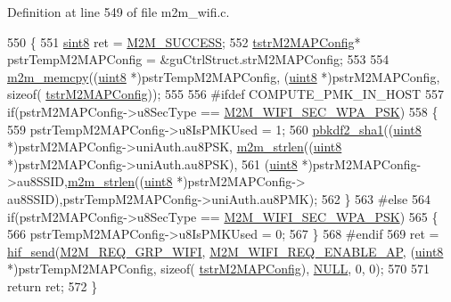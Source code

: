 Definition at line 549 of file m2m\+\_\+wifi.\+c.


\begin{DoxyCode}
550 \{
551     \hyperlink{group__DataT_gae35f10ffd0ac8dd2bc3e794da9bdfbc7}{sint8} ret = \hyperlink{nm__common_8h_a9ef27ba27aafdd1aa3a79d3ba2c36b8f}{M2M\_SUCCESS};
552     \hyperlink{structtstrM2MAPConfig}{tstrM2MAPConfig}* pstrTempM2MAPConfig = &guCtrlStruct.strM2MAPConfig;
553     
554     \hyperlink{nm__common_8h_a62b30b611dfcc58e190254d1f663470a}{m2m\_memcpy}((\hyperlink{group__DataT_ga4df709a77647e870bbf1d955b8edc9a6}{uint8} *)pstrTempM2MAPConfig, (\hyperlink{group__DataT_ga4df709a77647e870bbf1d955b8edc9a6}{uint8} *)pstrM2MAPConfig, \textcolor{keyword}{sizeof}(
      \hyperlink{structtstrM2MAPConfig}{tstrM2MAPConfig}));
555     
556 \textcolor{preprocessor}{#ifdef COMPUTE\_PMK\_IN\_HOST}
557     \textcolor{keywordflow}{if}(pstrM2MAPConfig->u8SecType == \hyperlink{group__WlanEnums_ggaa232a09c953ec8200c13774f94107b05a951d0504fc8e173e60df8ee871f16697}{M2M\_WIFI\_SEC\_WPA\_PSK})
558     \{       
559         pstrTempM2MAPConfig->u8IsPMKUsed = 1;
560         \hyperlink{third__party_2atmel_2devices_2wilc1000_2drv__hash_2crypto_8h_a318c7e175b5bc9991153031d59b52ac0}{pbkdf2\_sha1}((\hyperlink{group__DataT_ga4df709a77647e870bbf1d955b8edc9a6}{uint8} *)pstrM2MAPConfig->uniAuth.au8PSK,
      \hyperlink{nm__common_8h_a3c10c83b6b5eda6b18bbc40ca411eeb4}{m2m\_strlen}((\hyperlink{group__DataT_ga4df709a77647e870bbf1d955b8edc9a6}{uint8} *)pstrM2MAPConfig->uniAuth.au8PSK),
561             (\hyperlink{group__DataT_ga4df709a77647e870bbf1d955b8edc9a6}{uint8} *)pstrM2MAPConfig->au8SSID,\hyperlink{nm__common_8h_a3c10c83b6b5eda6b18bbc40ca411eeb4}{m2m\_strlen}((\hyperlink{group__DataT_ga4df709a77647e870bbf1d955b8edc9a6}{uint8} *)pstrM2MAPConfig->
      au8SSID),pstrTempM2MAPConfig->uniAuth.au8PMK);
562     \}
563 \textcolor{preprocessor}{#else}
564     \textcolor{keywordflow}{if}(pstrM2MAPConfig->u8SecType == \hyperlink{group__WlanEnums_ggaa232a09c953ec8200c13774f94107b05a951d0504fc8e173e60df8ee871f16697}{M2M\_WIFI\_SEC\_WPA\_PSK})
565     \{
566         pstrTempM2MAPConfig->u8IsPMKUsed = 0;
567     \}
568 \textcolor{preprocessor}{#endif}
569     ret = \hyperlink{m2m__hif_8c_a13ba8ad11b2ac39516ca787386d16ce0}{hif\_send}(\hyperlink{nm__common_8h_a9ab02eb1aea02a75c3f5aade4eef1276aeb9a7d57324ba4b8a6c2a5f46dd499c2}{M2M\_REQ\_GRP\_WIFI}, 
      \hyperlink{group__WlanEnums_ggaa62989ea5e2977b374a04db81c89d524aea60fb0c4912ce9ead2d776c19b4434f}{M2M\_WIFI\_REQ\_ENABLE\_AP}, (\hyperlink{group__DataT_ga4df709a77647e870bbf1d955b8edc9a6}{uint8} *)pstrTempM2MAPConfig, \textcolor{keyword}{sizeof}(
      \hyperlink{structtstrM2MAPConfig}{tstrM2MAPConfig}), \hyperlink{group__BSPDefine_ga070d2ce7b6bb7e5c05602aa8c308d0c4}{NULL}, 0, 0);   
570     
571     \textcolor{keywordflow}{return} ret;
572 \}
\end{DoxyCode}
